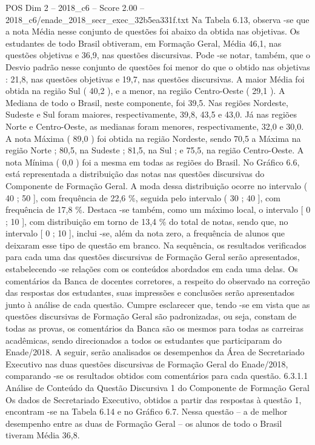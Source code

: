 \begin{textsample}{POS Dim 2 – 2018\_c6 – Score 2.00 – 2018\_c6/enade\_2018\_secr\_exec\_32b5ea331f.txt}
Na Tabela 6.13, observa -se que a nota Média nesse conjunto de questões foi abaixo da obtida nas objetivas.
Os estudantes de todo Brasil obtiveram, em Formação Geral, Média 46,1, nas questões objetivas e 36,9, nas questões discursivas.
Pode -se notar, também, que o Desvio padrão nesse conjunto de questões foi menor do que o obtido nas objetivas : 21,8, nas questões objetivas e 19,7, nas questões discursivas.
A maior Média foi obtida na região Sul ( 40,2 ), e a menor, na região Centro-Oeste ( 29,1 ).
A Mediana de todo o Brasil, neste componente, foi 39,5.
Nas regiões Nordeste, Sudeste e Sul foram maiores, respectivamente, 39,8, 43,5 e 43,0.
Já nas regiões Norte e Centro-Oeste, as medianas foram menores, respectivamente, 32,0 e 30,0.
A nota Máxima ( 89,0 ) foi obtida na região Nordeste, sendo 70,5 a Máxima na região Norte ; 80,5, na Sudeste ; 81,5, na Sul ; e 75,5, na região Centro-Oeste.
A nota Mínima ( 0,0 ) foi a mesma em todas as regiões do Brasil.
No Gráfico 6.6, está representada a distribuição das notas nas questões discursivas do Componente de Formação Geral.
A moda dessa distribuição ocorre no intervalo ( 40 ; 50 ], com frequência de 22,6 \%, seguida pelo intervalo ( 30 ; 40 ], com frequência de 17,8 \%.
Destaca -se também, como um máximo local, o intervalo [ 0 ; 10 ], com distribuição em torno de 13,4 \% do total de notas, sendo que, no intervalo [ 0 ; 10 ], inclui -se, além da nota zero, a frequência de alunos que deixaram esse tipo de questão em branco.
Na sequência, os resultados verificados para cada uma das questões discursivas de Formação Geral serão apresentados, estabelecendo -se relações com os conteúdos abordados em cada uma delas.
Os comentários da Banca de docentes corretores, a respeito do observado na correção das respostas dos estudantes, suas impressões e conclusões serão apresentados junto à análise de cada questão.
Cumpre esclarecer que, tendo -se em vista que as questões discursivas de Formação Geral são padronizadas, ou seja, constam de todas as provas, os comentários da Banca são os mesmos para todas as carreiras acadêmicas, sendo direcionados a todos os estudantes que participaram do Enade/2018.
A seguir, serão analisados os desempenhos da Área de Secretariado Executivo nas duas questões discursivas de Formação Geral do Enade/2018, comparando -se os resultados obtidos com comentários para cada questão. 6.3.1.1 Análise de Conteúdo da Questão Discursiva 1 do Componente de Formação Geral Os dados de Secretariado Executivo, obtidos a partir das respostas à questão 1, encontram -se na Tabela 6.14 e no Gráfico 6.7.
Nessa questão – a de melhor desempenho entre as duas de Formação Geral – os alunos de todo o Brasil tiveram Média 36,8.

\end{textsample}
